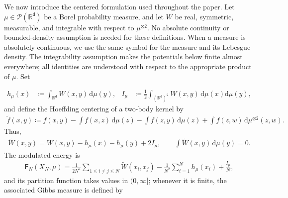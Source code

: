 \documentclass[11pt,reqno]{amsart}
\numberwithin{equation}{section}
\theoremstyle{plain}
\theoremstyle{remark}
\renewcommand{\d}{\mathsf{d}}
\newcommand{\md}{\mathrm{d}}
\newcommand{\R}{{\mathbb{R}}}
\newcommand{\tl}{\widetilde}
\newcommand{\Fr}{{\mathsf{F}}}
\newcommand{\XN}{X_N}
\newcommand{\Pp}{\mathcal{P}}
\begin{document}
We now introduce the centered formulation used throughout the paper.  Let $\mu\in\Pp(\R^\d)$ be a Borel probability measure, and let $W$ be real, symmetric, measurable, and integrable with respect to $\mu^{\otimes2}$.  No absolute continuity or bounded-density assumption is needed for these definitions.  When a measure is absolutely continuous, we use the same symbol for the measure and its Lebesgue density.  The integrability assumption makes the potentials below finite almost everywhere; all identities are understood with respect to the appropriate product of $\mu$.  Set

\begin{align}\label{eq:h-I-tildeg-statement}
 h_\mu(x)&\coloneqq\int_{\R^\d}W(x,y)\,\md\mu(y),
 &
 I_\mu&\coloneqq\frac12\int_{(\R^\d)^2}W(x,y)\,\md\mu(x)\md\mu(y),
\end{align}
and define the Hoeffding centering of a two-body kernel by
\begin{align}\label{eq:tildeg-def-statement}
 \tl f(x,y)
 \coloneqq
 f(x,y)-\int f(x,z)\,\md\mu(z)-\int f(z,y)\,\md\mu(z)
 +\int f(z,w)\,\md\mu^{\otimes2}(z,w).
\end{align}
Thus,
\begin{align}\label{eq:centered-W-explicit}
 \tl W(x,y)=W(x,y)-h_\mu(x)-h_\mu(y)+2I_\mu,
 \qquad
 \int\tl W(x,y)\,\md\mu(y)=0.
\end{align}
The modulated energy is
\begin{align}\label{eq:FN-def-intro}
 \Fr_N(\XN,\mu)
 =\frac{1}{2N^2}\sum_{1\le i\ne j\le N}\tl W(x_i,x_j)
 -\frac{1}{N^2}\sum_{i=1}^N h_\mu(x_i)
 +\frac{I_\mu}{N},
\end{align}
and its partition function takes values in $(0,\infty]$; whenever it is finite, the associated Gibbs measure is defined by
\end{document}

